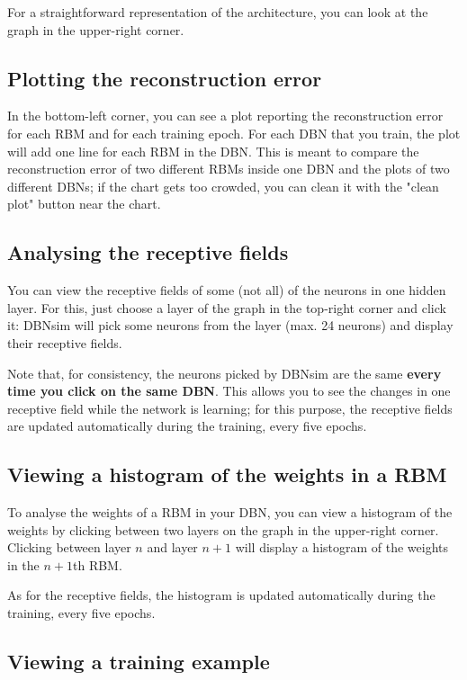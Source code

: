 \documentclass[a4paper]{article}
\begin{document}
		
For a straightforward representation of the architecture, you can look at the graph in the upper-right corner.

		
	\subsection{Plotting the reconstruction error}

		
In the bottom-left corner, you can see a plot reporting the reconstruction error for each RBM and for each training epoch. For each DBN that you train, the plot will add one line for each RBM in the DBN. This is meant to compare the reconstruction error of two different RBMs inside one DBN and the plots of two different DBNs; if the chart gets too crowded, you can clean it with the "clean plot" button near the chart.

		
	\subsection{Analysing the receptive fields}

		
You can view the receptive fields of some (not all) of the neurons in one hidden layer. For this, just choose a layer of the graph in the top-right corner and click it: DBNsim will pick some neurons from the layer (max. 24 neurons) and display their receptive fields.
		
Note that, for consistency, the neurons picked by DBNsim are the same \textbf{every time you click on the same DBN}. This allows you to see the changes in one receptive field while the network is learning; for this purpose, the receptive fields are updated automatically during the training, every five epochs.

		
	\subsection{Viewing a histogram of the weights in a RBM}

		
To analyse the weights of a RBM in your DBN, you can view a histogram of the weights by clicking between two layers on the graph in the upper-right corner. Clicking between layer $n$ and layer $n+1$ will display a histogram of the weights in the $n+1$th RBM.
		
As for the receptive fields, the histogram is updated automatically during the training, every five epochs.

		
	\subsection{Viewing a training example}
\end{document}
